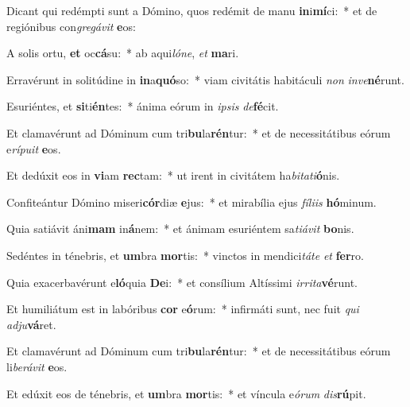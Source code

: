 \item Dicant qui redémpti sunt a Dómino, quos redémit de manu \textbf{in}i\textbf{mí}ci:~* et de regiónibus con\textit{gre}\textit{gá}\textit{vit} \textbf{e}os:
\item A solis ortu, \textbf{et} oc\textbf{cá}su:~* ab aqui\textit{ló}\textit{ne}, \textit{et} \textbf{ma}ri.
\item Erravérunt in solitúdine in \textbf{in}a\textbf{quó}so:~* viam civitátis habitáculi \textit{non} \textit{in}\textit{ve}\textbf{né}runt.
\item Esuriéntes, et \textbf{si}ti\textbf{én}tes:~* ánima eórum in \textit{ip}\textit{sis} \textit{de}\textbf{fé}cit.
\item Et clamavérunt ad Dóminum cum tri\textbf{bu}la\textbf{rén}tur:~* et de necessitátibus eórum e\textit{rí}\textit{pu}\textit{it} \textbf{e}os.
\item Et dedúxit eos in \textbf{vi}am \textbf{rec}tam:~* ut irent in civitátem ha\textit{bi}\textit{ta}\textit{ti}\textbf{ó}nis.
\item Confiteántur Dómino miseri\textbf{cór}diæ \textbf{e}jus:~* et mirabília ejus \textit{fí}\textit{li}\textit{is} \textbf{hó}minum.
\item Quia satiávit áni\textbf{mam} in\textbf{á}nem:~* et ánimam esuriéntem sa\textit{ti}\textit{á}\textit{vit} \textbf{bo}nis.
\item Sedéntes in ténebris, et \textbf{um}bra \textbf{mor}tis:~* vinctos in mendici\textit{tá}\textit{te} \textit{et} \textbf{fer}ro.
\item Quia exacerbavérunt e\textbf{ló}quia \textbf{De}i:~* et consílium Altíssimi \textit{ir}\textit{ri}\textit{ta}\textbf{vé}runt.
\item Et humiliátum est in labóribus \textbf{cor} e\textbf{ó}rum:~* infirmáti sunt, nec fuit \textit{qui} \textit{ad}\textit{ju}\textbf{vá}ret.
\item Et clamavérunt ad Dóminum cum tri\textbf{bu}la\textbf{rén}tur:~* et de necessitátibus eórum li\textit{be}\textit{rá}\textit{vit} \textbf{e}os.
\item Et edúxit eos de ténebris, et \textbf{um}bra \textbf{mor}tis:~* et víncula e\textit{ó}\textit{rum} \textit{dis}\textbf{rú}pit.
